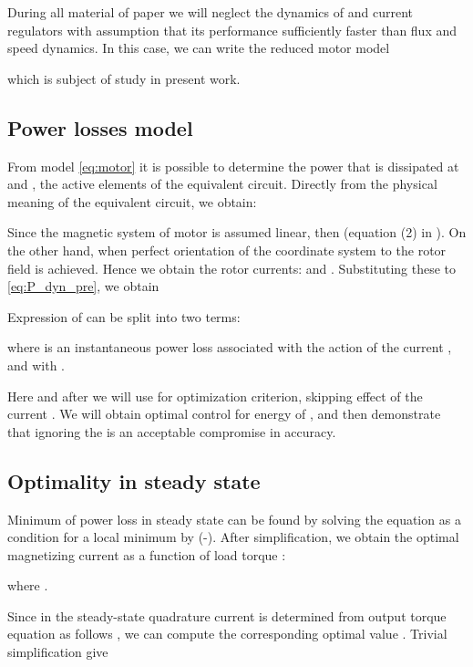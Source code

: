 \documentclass[journal]{IEEEtran}
\begin{document}
During all material of paper we will neglect the dynamics of  and  current regulators with assumption that its performance sufficiently faster than flux and speed dynamics. In this case, we can write the reduced motor model



which is subject of study in present work.

\subsection{Power losses model}

From model \eqref{eq:motor} it is possible to determine the power that is dissipated at  and , the active elements of the equivalent circuit. Directly from the physical meaning of the equivalent circuit, we obtain:



Since the magnetic system of motor is assumed linear, then  (equation (2) in \cite{8}). On the other hand,  when perfect orientation of the coordinate system to the rotor field is achieved. Hence we obtain the rotor currents:  and . Substituting these to \eqref{eq:P_dyn_pre}, we obtain



Expression of  can be split into two terms:



where  is an instantaneous power loss associated with the action of the current , and  with .

Here and after we will use  for optimization criterion, skipping effect of the current . We will obtain optimal control for energy of , and then demonstrate that ignoring the  is an acceptable compromise in accuracy.

\subsection{Optimality in steady state}

Minimum of power loss in steady state can be found by solving the equation  as a condition for a local minimum by  (\cite{1}-\cite{2}). After simplification, we obtain the optimal magnetizing current as a function of load torque :



where .

Since in the steady-state quadrature current is determined from output torque equation as follows , we can compute the corresponding optimal value . Trivial simplification give
\end{document}

